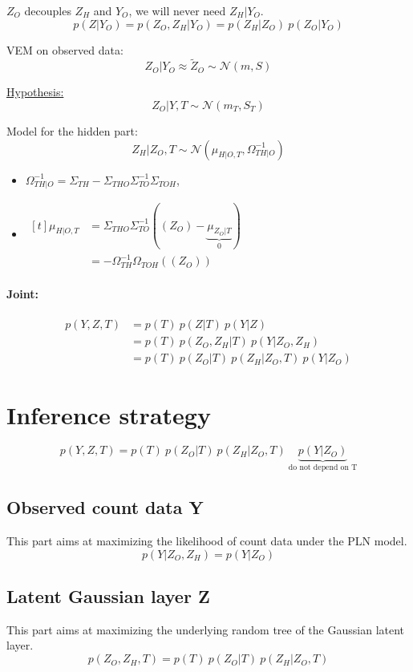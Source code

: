 \documentclass[11pt,a4paper]{article}
\begin{document}
$Z_O$ decouples $Z_H$ and $Y_O$, we will never need $Z_H|Y_O$.
$$ p(Z|Y_O) = p(Z_O,Z_H | Y_O) = p(Z_H|Z_O) \: p(Z_O|Y_O) $$


VEM on observed data: $$Z_O|Y_O \approx \widetilde{Z}_O \sim \mathcal{N}(m,S)$$

\underline{ Hypothesis:}
$$ Z_O|Y,T \sim \mathcal{N}(m_T,S_T)$$

Model for the hidden part: $$Z_H|Z_O,T \sim \mathcal{N}(\mu_{H|O,T}, \Omega_{TH|O}^{-1})$$ 

\begin{itemize}
\item $\Omega_{TH|O}^{-1} = \Sigma_{TH} -\Sigma_{THO}\Sigma_{TO}^{-1}\Sigma_{TOH}$, 

\item$ \displaystyle\begin{aligned}[t]
\mu_{H|O,T} &= \Sigma_{THO}\Sigma_{TO}^{-1}((Z_O)-\underbrace{\mu_{Z_O|T}}_{0}) \\
 &= -\Omega_{TH}^{-1}\Omega_{TOH}((Z_O))
\end{aligned}$\\
\end{itemize}


\paragraph{Joint:}
\begin{align*}
p(Y,Z,T)& = p(T) \: p(Z|T) \: p(Y|Z) \\
&= p(T)\: p(Z_O,Z_H|T) \: p(Y|Z_O,Z_H) \\
&= p(T) \: p(Z_O|T) \: p(Z_H | Z_O,T)  \: p(Y|Z_O)
\end{align*} 

\section{Inference strategy}
$$p(Y,Z,T)= p(T) \: p(Z_O|T) \: p(Z_H | Z_O,T)  \: \underbrace{p(Y|Z_O)}_{\text{do not depend on T}}$$
\subsection{Observed count data Y}
This part aims at maximizing the likelihood of count data under the PLN model. 
$$p(Y|Z_O,Z_H) = p(Y|Z_O)$$
\subsection{Latent Gaussian layer Z}
This part aims at maximizing the underlying random tree of the Gaussian latent layer.
$$p(Z_O,Z_H,T) = p(T) \: p(Z_O|T) \: p(Z_H | Z_O,T)$$
\end{document}
